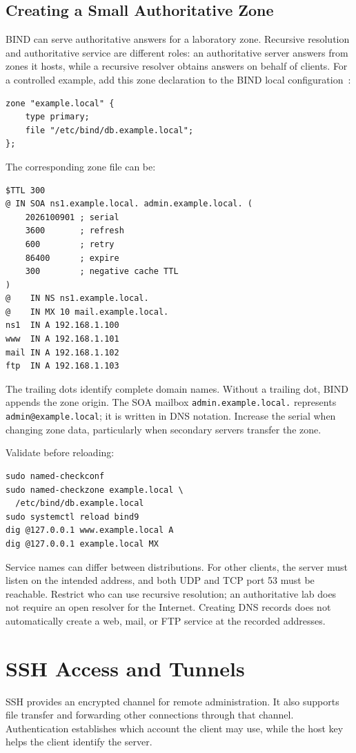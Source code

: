 \documentclass[journal]{IEEEtran}
\begin{document}
\subsection{Creating a Small Authoritative Zone}
BIND can serve authoritative answers for a laboratory zone. Recursive resolution and authoritative service are different roles: an authoritative server answers from zones it hosts, while a recursive resolver obtains answers on behalf of clients. For a controlled example, add this zone declaration to the BIND local configuration~\cite{bind}:
\begin{lstlisting}
zone "example.local" {
    type primary;
    file "/etc/bind/db.example.local";
};
\end{lstlisting}
The corresponding zone file can be:
\begin{lstlisting}
$TTL 300
@ IN SOA ns1.example.local. admin.example.local. (
    2026100901 ; serial
    3600       ; refresh
    600        ; retry
    86400      ; expire
    300        ; negative cache TTL
)
@    IN NS ns1.example.local.
@    IN MX 10 mail.example.local.
ns1  IN A 192.168.1.100
www  IN A 192.168.1.101
mail IN A 192.168.1.102
ftp  IN A 192.168.1.103
\end{lstlisting}
The trailing dots identify complete domain names. Without a trailing dot, BIND appends the zone origin. The SOA mailbox \texttt{admin.example.local.} represents \texttt{admin@example.local}; it is written in DNS notation. Increase the serial when changing zone data, particularly when secondary servers transfer the zone.

Validate before reloading:
\begin{lstlisting}
sudo named-checkconf
sudo named-checkzone example.local \
  /etc/bind/db.example.local
sudo systemctl reload bind9
dig @127.0.0.1 www.example.local A
dig @127.0.0.1 example.local MX
\end{lstlisting}
Service names can differ between distributions. For other clients, the server must listen on the intended address, and both UDP and TCP port 53 must be reachable. Restrict who can use recursive resolution; an authoritative lab does not require an open resolver for the Internet. Creating DNS records does not automatically create a web, mail, or FTP service at the recorded addresses.

\section{SSH Access and Tunnels}
SSH provides an encrypted channel for remote administration. It also supports file transfer and forwarding other connections through that channel. Authentication establishes which account the client may use, while the host key helps the client identify the server.
\end{document}

